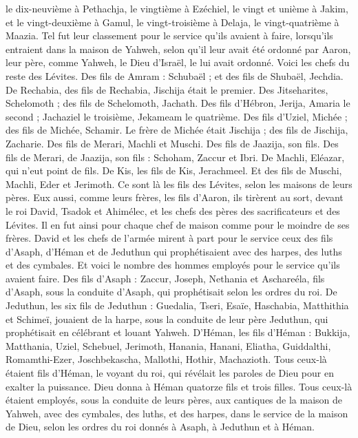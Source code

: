 \begin{multicols}{2}
le dix-neuvième à Pethachja, le vingtième à Ezéchiel,
le vingt et unième à Jakim, et le vingt-deuxième à Gamul,
le vingt-troisième à Delaja, le vingt-quatrième à Maazia.
Tel fut leur classement pour le service qu'ils avaient à faire, lorsqu'ils entraient dans la maison de Yahweh, selon qu'il leur avait été ordonné par Aaron, leur père, comme Yahweh, le Dieu d'Israël, le lui avait ordonné.
Voici les chefs du reste des Lévites. Des fils de Amram : Schubaël ; et des fils de Shubaël, Jechdia.
De Rechabia, des fils de Rechabia, Jischija était le premier.
Des Jitseharites, Schelomoth ; des fils de Schelomoth, Jachath.
Des fils d’Hébron, Jerija, Amaria le second ; Jachaziel le troisième, Jekameam le quatrième.
Des fils d'Uziel, Michée ; des fils de Michée, Schamir.
Le frère de Michée était Jischija ; des fils de Jischija, Zacharie.
Des fils de Merari, Machli et Muschi. Des fils de Jaazija, son fils.
Des fils de Merari, de Jaazija, son fils : Schoham, Zaccur et Ibri.
De Machli, Eléazar, qui n'eut point de fils.
De Kis, les fils de Kis, Jerachmeel.
Et des fils de Muschi, Machli, Eder et Jerimoth. Ce sont là les fils des Lévites, selon les maisons de leurs pères.
Eux aussi, comme leurs frères, les fils d'Aaron, ils tirèrent au sort, devant le  roi David, Tsadok et Ahimélec, et les chefs des pères des sacrificateurs et des Lévites. Il en fut ainsi pour chaque chef de maison comme pour le moindre de ses frères.
\VerseOne{}David et les chefs de l'armée mirent à part pour le service ceux des fils d'Asaph, d'Héman et de Jeduthun qui prophétisaient avec des harpes, des luths et des cymbales. Et voici le nombre des hommes employés pour le service qu’ils avaient faire.
Des fils d'Asaph : Zaccur, Joseph, Nethania et Aschareéla, fils d'Asaph, sous la conduite d'Asaph, qui prophétisait selon les ordres du roi.
De Jeduthun, les six fils de Jeduthun : Guedalia, Tseri, Esaïe, Haschabia, Matthithia et Schimeï, jouaient de la harpe, sous la conduite de leur père Jeduthun, qui prophétisait en célébrant et louant Yahweh.
D'Héman, les fils d'Héman : Bukkija, Matthania, Uziel, Schebuel, Jerimoth, Hanania, Hanani, Eliatha, Guiddalthi, Romamthi-Ezer, Joschbekascha, Mallothi, Hothir, Machazioth.
Tous ceux-là étaient fils d'Héman, le voyant du roi, qui révélait les paroles de Dieu pour en exalter la puissance. Dieu donna à Héman quatorze fils et trois filles.
Tous ceux-là étaient employés, sous la conduite de leurs pères, aux cantiques de la maison de Yahweh, avec des cymbales, des luths, et des harpes, dans le service de la maison de Dieu, selon les ordres du roi donnés à Asaph, à Jeduthun et à Héman.

\end{multicols}
